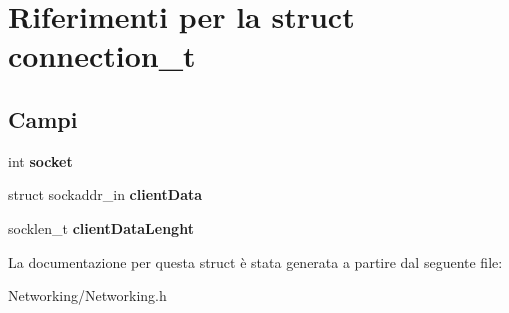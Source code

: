 \hypertarget{structconnection__t}{}\section{Riferimenti per la struct connection\+\_\+t}
\label{structconnection__t}
\subsection*{Campi}
\begin{DoxyCompactItemize}
\item 
int {\bfseries socket}\hypertarget{structconnection__t_a8739936cfe1c4e9f23368e375c976c92}{}\label{structconnection__t_a8739936cfe1c4e9f23368e375c976c92}

\item 
struct sockaddr\+\_\+in {\bfseries client\+Data}\hypertarget{structconnection__t_a2b4d38d53b1ca15e78ff677f8e6fc761}{}\label{structconnection__t_a2b4d38d53b1ca15e78ff677f8e6fc761}

\item 
socklen\+\_\+t {\bfseries client\+Data\+Lenght}\hypertarget{structconnection__t_ada2a0ae1a1bcf2709cfda2d95e9ac1a1}{}\label{structconnection__t_ada2a0ae1a1bcf2709cfda2d95e9ac1a1}

\end{DoxyCompactItemize}


La documentazione per questa struct è stata generata a partire dal seguente file\+:\begin{DoxyCompactItemize}
\item 
Networking/Networking.\+h\end{DoxyCompactItemize}
